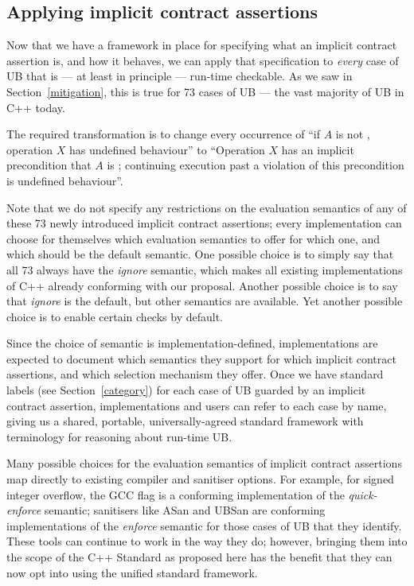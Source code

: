\subsection{Applying implicit contract assertions}
\label{applyicas}

Now that we have a framework in place for specifying what an implicit contract assertion is, and how it behaves, we can apply that specification to \emph{every} case of UB  that is --- at least in principle --- run-time checkable. As we saw in Section~\ref{mitigation}, this is true for 73 cases of UB --- the vast majority of UB in C++ today.

The required transformation is to change every occurrence of “if $A$ is not , operation $X$ has undefined behaviour'' to ``Operation $X$ has an implicit precondition that $A$ is ; continuing execution past a violation of this precondition is undefined behaviour''.

Note that we do not specify any restrictions on the evaluation semantics of any of these 73 newly introduced  implicit contract assertions; every implementation can choose for themselves which evaluation semantics to offer for which one, and which should be the default semantic. One possible choice is to simply say that all 73 always have the \emph{ignore} semantic, which makes all existing implementations of C++ already conforming with our proposal. Another possible choice is to say that  \emph{ignore} is the default, but other semantics are available. Yet another possible choice is to enable certain checks by default.

Since the choice of semantic is implementation-defined, implementations are expected to document which semantics they support for which implicit contract assertions, and which selection mechanism they offer. Once we have standard labels (see Section~\ref{category}) for each case of UB guarded by an implicit contract assertion, implementations and users can refer to each case by name, giving us a shared, portable, universally-agreed standard framework with terminology for reasoning about run-time UB.

Many possible choices for the evaluation semantics of implicit contract assertions map directly to existing compiler and sanitiser options. For example, for signed integer overflow, the GCC flag  is a conforming implementation of the \emph{quick-enforce} semantic; sanitisers like ASan and UBSan are conforming implementations of the \emph{enforce} semantic for those cases of UB that they identify. These tools can continue to work in the way they do; however, bringing them into the scope of the C++ Standard as proposed here has the benefit that they can now opt into using the unified standard framework.

